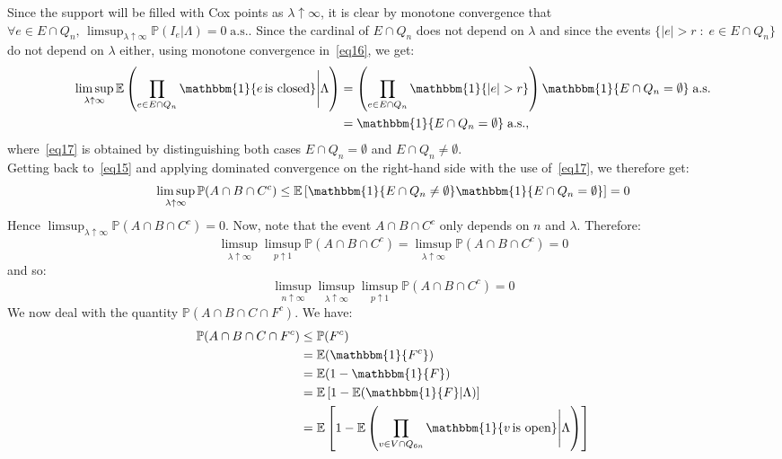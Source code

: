 \documentclass[10pt,a4paper]{amsart}
\theoremstyle{exampstyle}
\theoremstyle{exampnotations}
\begin{document}
Since the support will be filled with Cox points as $\lambda \uparrow \infty$, it is clear by monotone convergence that $\displaystyle \forall e \in E \cap Q_n, \, \limsup_{\lambda \uparrow \infty} \mathbb{P}(I_e \vert \Lambda) = 0 \; \text{a.s.}$. Since the cardinal of $E \cap Q_n$ does not depend on $\lambda$ and since the events $\lbrace \vert e \vert > r \; : \; e \in E \cap Q_n \rbrace$ do not depend on $\lambda$ either, using monotone convergence in~\eqref{eq16}, we get:
\begin{align}
   \nonumber  \limsup_{\lambda \uparrow \infty} \mathbb{E}\left( \prod_{e \in E \cap Q_n} \mathbbm{1} \lbrace e \, \text{is closed} \rbrace \Bigg\vert \Lambda \right) &= \left(\prod_{e \in E \cap Q_n} \mathbbm{1} \lbrace \vert e \vert > r \rbrace \right) \mathbbm{1}\lbrace E \cap Q_n = \emptyset \rbrace \; \text{a.s.}
   \\ \label{eq17} &= \mathbbm{1} \lbrace E \cap Q_n = \emptyset \rbrace \; \text{a.s.},
\end{align}
where~\eqref{eq17} is obtained by distinguishing both cases $E \cap Q_n = \emptyset$ and $E \cap Q_n \neq \emptyset$. \\
Getting back to~\eqref{eq15} and applying dominated convergence on the right-hand side with the use of~\eqref{eq17}, we therefore get:
\begin{equation*}
  \limsup_{\lambda \uparrow \infty} \mathbb{P}(A \cap B \cap C^c) \leq \mathbb{E}\left[\mathbbm{1}\lbrace E \cap Q_n \neq \emptyset \rbrace \mathbbm{1} \lbrace E \cap Q_n = \emptyset \rbrace \right] = 0  
\end{equation*}
Hence $\limsup_{\lambda \uparrow \infty} \mathbb{P}(A \cap B \cap C^c) = 0$. Now, note that the event $A \cap B \cap C^c$ only depends on $n$ and $\lambda$. Therefore:
\begin{equation*}
   \limsup_{\lambda \uparrow \infty}\limsup_{p \uparrow 1} \mathbb{P}(A \cap B \cap C^c) = \limsup_{\lambda \uparrow \infty} \mathbb{P}(A \cap B \cap C^c) = 0
\end{equation*}
and so:
\begin{equation}
    \label{eq18}
    \limsup_{n \uparrow \infty}\limsup_{\lambda \uparrow \infty}\limsup_{p \uparrow 1} \mathbb{P}(A \cap B \cap C^c) = 0
\end{equation}
We now deal with the quantity $\mathbb{P}(A \cap B \cap C \cap F^c)$. We have: 
\begin{align*}
    \mathbb{P}(A \cap B \cap C \cap F^c) &\leq \mathbb{P}(F^{c})
    \\ &= \mathbb{E}(\mathbbm{1}\lbrace F^c \rbrace)
    \\ &= \mathbb{E}(1-\mathbbm{1}\lbrace F \rbrace)
    \\ &= \mathbb{E}\left[1-\mathbb{E}(\mathbbm{1}\lbrace F \rbrace \vert \Lambda ) \right]
    \\ &= \mathbb{E}\left[1-\mathbb{E}\left( \prod_{v \in V \cap Q_{6n}} \mathbbm{1}\lbrace v \, \text{is open} \rbrace \Bigg\vert \Lambda \right)\right]
\end{align*}
\end{document}
